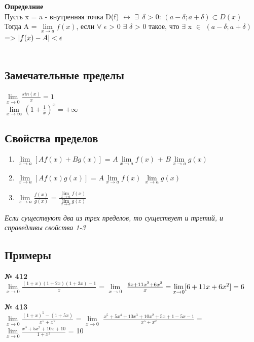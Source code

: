 \documentclass[12pt]{article}
\DeclarePairedDelimiter\abs{\lvert}{\rvert}%
\begin{document}
{
	\newpage
	\textbf{Определние}\\
	Пусть x = a - внутренняя точка D(f) $\leftrightarrow$ $\exists \enspace \delta$ > 0: $(a - \delta; a + \delta) \subset D(x)$
	Тогда A = $\lim\limits_{x \to a}f(x)$, если $\forall$ $\epsilon$ > 0 $\exists$ $\delta$ > 0 такое, что $\exists$ x $\in$ $(a - \delta; a + \delta)$ => $\abs{f(x) - A}<\epsilon$\\
	\vspace{.5cm}\\
	
	\subsection{Замечательные пределы}

	$\lim\limits_{x \to 0}\frac{sin(x)}{x} = 1$\\
	$\lim\limits_{x \to \infty}(1 + \frac{1}{x})^x = +\infty$\\
	
	\vspace{.5cm}
	\subsection{Свойства пределов}
	\begin{enumerate}
		\item {
		$\lim\limits_{x \to a}[Af(x) + Bg(x)]$ = $A\lim\limits_{x \to a}f(x)$ + 
		$B\lim\limits_{x \to a}g(x)$
	}
\item{
		$\lim\limits_{x \to a}[Af(x)g(x)]$ = $A\lim\limits_{x \to a}f(x)$ 
	$\lim\limits_{x \to a}g(x)$
}
\item{
	$\lim\limits_{x \to a} \frac{f(x)}{g(x)}$ = $\frac{\lim\limits_{x \to a}f(x)}{\lim\limits_{x \to a}g(x)}$
}
	\end{enumerate}
	\emph{Если существуют два из трех пределов, то существует и третий, и справедливы свойства 1-3}
	
	\vspace{.5cm}
	\subsection{Примеры}


	{
		{\textbf{№ 412}\\ \vspace{.5cm}}
		\Large{$\lim\limits_{x \to 0} \frac{(1+x)(1+2x)(1+3x) - 1}{x}$ = $\lim\limits_{x \to 0}$}
		$\frac{6x + 11x^2 + 6x^3}{x}\\ = \lim\limits_{x \to 0}[6+11x+6x^2] = 6$	
	}
	\newpage
	{
		{\textbf{№ 413} \vspace{.5cm}\\}
		\Large{$\lim\limits_{x \to 0} \frac{(1+x)^5-(1+5x)}{x^5+x^2}$ = $\lim\limits_{x \to 0}$
		$\frac{x^{5}+5x^{4}+10x^{3}+10x^{2}+5x+1-5x-1}{x^5+x^2} = $
		$\lim\limits_{x \to 0} \frac{x^3+5x^2+10x+10}{1+x^3}$ = 10}
	
}}
\end{document}
